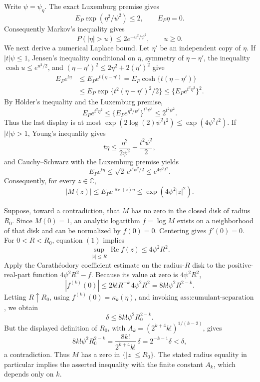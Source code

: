 Write \(\psi=\psi_{\eta}\).  The exact Luxemburg premise gives
\[
 E_P\exp(\eta^2/\psi^2)\le2,
 \qquad E_P\eta=0.
\]
Consequently Markov's inequality gives
\[
 P(|\eta|>u)\le2e^{-u^2/\psi^2},\qquad u\ge0.
\]
We next derive a numerical Laplace bound.  Let \(\eta'\) be an independent copy of \(\eta\).  If \(|t|\psi\le1\), Jensen's inequality conditional on \(\eta\), symmetry of \(\eta-\eta'\), the inequality \(\cosh u\le e^{u^2/2}\), and \((\eta-\eta')^2\le2\eta^2+2(\eta')^2\) give
\[
\begin{aligned}
 E_Pe^{t\eta}
 &\le E_Pe^{t(\eta-\eta')}
 =E_P\cosh\{t(\eta-\eta')\}\\
 &\le E_P\exp\{t^2(\eta-\eta')^2/2\}
 \le\{E_Pe^{t^2\eta^2}\}^2.
\end{aligned}
\]
By Hölder's inequality and the Luxemburg premise,
\[
 E_Pe^{t^2\eta^2}
 \le\{E_Pe^{\eta^2/\psi^2}\}^{t^2\psi^2}
 \le2^{t^2\psi^2}.
\]
Thus the last display is at most
\(\exp(2\log(2)\psi^2t^2)\le\exp(4\psi^2t^2)\).
If \(|t|\psi>1\), Young's inequality gives
\[
 t\eta\le\frac{\eta^2}{2\psi^2}+\frac{t^2\psi^2}{2},
\]
and Cauchy--Schwarz with the Luxemburg premise yields
\[
 E_Pe^{t\eta}
 \le\sqrt2\,e^{t^2\psi^2/2}
 \le e^{4\psi^2t^2}.
\]
Consequently, for every \(z\in\mathbb C\),
\[
 |M(z)|
 \le E_Pe^{\operatorname{Re}(z)\eta}
 \le \exp(4\psi^2|z|^2). \tag{1}
\]

Suppose, toward a contradiction, that \(M\) has no zero in the closed disk of radius \(R_0\).  Since \(M(0)=1\), an analytic logarithm \(f=\log M\) exists on a neighborhood of that disk and can be normalized by \(f(0)=0\).  Centering gives \(f'(0)=0\).  For \(0<R<R_0\), equation \((1)\) implies
\[
 \sup_{|z|\le R}\operatorname{Re}f(z)
 \le4\psi^2R^2.
\]
Apply the Carath\'eodory coefficient estimate on the radius-\(R\) disk to the positive-real-part function \(4\psi^2R^2-f\).  Because its value at zero is \(4\psi^2R^2\),
\[
 |f^{(k)}(0)|
 \le 2k!R^{-k}\,4\psi^2R^2
 =8k!\psi^2R^{2-k}. \tag{2}
\]
Letting \(R\uparrow R_0\), using \(f^{(k)}(0)=\kappa_k(\eta)\), and invoking \(\text{ass:cumulant-separation}\), we obtain
\[
 \delta\le8k!\psi^2R_0^{2-k}.
\]
But the displayed definition of \(R_0\), with
\(A_k=(2^{k+4}k!)^{1/(k-2)}\), gives
\[
 8k!\psi^2R_0^{2-k}
 =\frac{8k!}{2^{k+4}k!}\,\delta
 =2^{-k-1}\delta<\delta,
\]
a contradiction.  Thus \(M\) has a zero in \(\{|z|\le R_0\}\).  The stated radius equality in particular implies the asserted inequality with the finite constant \(A_k\), which depends only on \(k\).